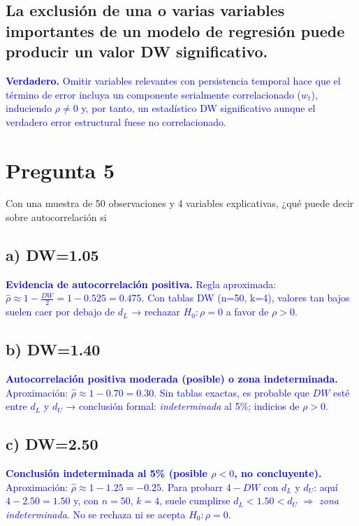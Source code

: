 \documentclass[10pt]{article}
\begin{document}
\subsection{La exclusión de una o varias variables importantes de un modelo de regresión puede producir un valor DW significativo.}
\textcolor{blue}{
    \textbf{Verdadero.} Omitir variables relevantes con persistencia temporal hace que el término de error incluya un componente serialmente correlacionado ($w_t$), induciendo $\rho\neq0$ y, por tanto, un estadístico DW significativo aunque el verdadero error estructural fuese no correlacionado.
}
\section{Pregunta 5}
Con una muestra de 50 observaciones y 4 variables explicativas, ¿qué puede decir sobre autocorrelación si
\subsection{a) DW=1.05}
\textcolor{blue}{
\textbf{Evidencia de autocorrelación positiva.} Regla aproximada: $\hat\rho\approx1-\tfrac{DW}{2}=1-0.525=0.475$. Con tablas DW (n=50, k=4), valores tan bajos suelen caer por debajo de $d_L$ → rechazar $H_0:\rho=0$ a favor de $\rho>0$.
}
\subsection{b) DW=1.40}
\textcolor{blue}{
\textbf{Autocorrelación positiva moderada (posible) o zona indeterminada.} Aproximación: $\hat\rho\approx1-0.70=0.30$. Sin tablas exactas, es probable que $DW$ esté entre $d_L$ y $d_U$ → conclusión formal: \emph{indeterminada} al 5\%; indicios de $\rho>0$.
}
\subsection{c) DW=2.50}
\textcolor{blue}{
\textbf{Conclusión indeterminada al 5\% (posible $\rho<0$, no concluyente).} Aproximación: $\hat\rho\approx1-1.25=-0.25$. Para probarr $4-\textit{DW}$ con $d_L$ y $d_U$: aquí $4-2.50=1.50$ y, con $n=50$, $k=4$, suele cumplirse $d_L<1.50<d_U$ $\Rightarrow$ \emph{zona indeterminada}. No se rechaza ni se acepta $H_0:\rho=0$.
}
\end{document}
